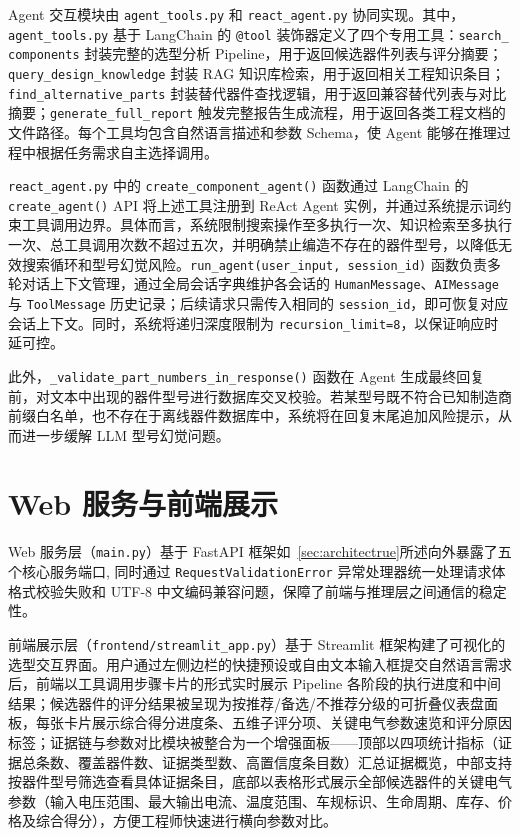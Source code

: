 Agent 交互模块由 \texttt{agent\_tools.py} 和 \texttt{react\_agent.py} 协同实现。其中，\texttt{agent\_tools.py} 基于 LangChain 的 \texttt{@tool} 装饰器定义了四个专用工具：\texttt{search\_\\components} 封装完整的选型分析 Pipeline，用于返回候选器件列表与评分摘要；\texttt{query\_design\_knowledge} 封装 RAG 知识库检索，用于返回相关工程知识条目；\texttt{find\_alternative\_parts} 封装替代器件查找逻辑，用于返回兼容替代列表与对比摘要；\texttt{generate\_full\_report} 触发完整报告生成流程，用于返回各类工程文档的文件路径。每个工具均包含自然语言描述和参数 Schema，使 Agent 能够在推理过程中根据任务需求自主选择调用。

\texttt{react\_agent.py} 中的 \texttt{create\_component\_agent()} 函数通过 LangChain 的 \texttt{create\_agent()} API 将上述工具注册到 ReAct Agent 实例，并通过系统提示词约束工具调用边界。具体而言，系统限制搜索操作至多执行一次、知识检索至多执行一次、总工具调用次数不超过五次，并明确禁止编造不存在的器件型号，以降低无效搜索循环和型号幻觉风险。\texttt{run\_agent(user\_input, session\_id)} 函数负责多轮对话上下文管理，通过全局会话字典维护各会话的 \texttt{HumanMessage}、\texttt{AIMessage} 与 \texttt{ToolMessage} 历史记录；后续请求只需传入相同的 \texttt{session\_id}，即可恢复对应会话上下文。同时，系统将递归深度限制为 \texttt{recursion\_limit=8}，以保证响应时延可控。

此外，\texttt{\_validate\_part\_numbers\_in\_response()} 函数在 Agent 生成最终回复前，对文本中出现的器件型号进行数据库交叉校验。若某型号既不符合已知制造商前缀白名单，也不存在于离线器件数据库中，系统将在回复末尾追加风险提示，从而进一步缓解 LLM 型号幻觉问题。

\section{Web 服务与前端展示}

Web 服务层（\texttt{main.py}）基于 FastAPI 框架如~\ref{sec:architectrue}所述向外暴露了五个核心服务端口, 同时通过 \texttt{RequestValidationError} 异常处理器统一处理请求体格式校验失败和 UTF-8 中文编码兼容问题，保障了前端与推理层之间通信的稳定性。

前端展示层（\texttt{frontend/streamlit\_app.py}）基于 Streamlit 框架构建了可视化的选型交互界面。用户通过左侧边栏的快捷预设或自由文本输入框提交自然语言需求后，前端以工具调用步骤卡片的形式实时展示 Pipeline 各阶段的执行进度和中间结果；候选器件的评分结果被呈现为按推荐/备选/不推荐分级的可折叠仪表盘面板，每张卡片展示综合得分进度条、五维子评分项、关键电气参数速览和评分原因标签；证据链与参数对比模块被整合为一个增强面板——顶部以四项统计指标（证据总条数、覆盖器件数、证据类型数、高置信度条目数）汇总证据概览，中部支持按器件型号筛选查看具体证据条目，底部以表格形式展示全部候选器件的关键电气参数（输入电压范围、最大输出电流、温度范围、车规标识、生命周期、库存、价格及综合得分），方便工程师快速进行横向参数对比。
